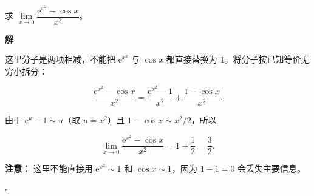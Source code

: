 \documentclass[fontset=fandol]{ctexart}
\newenvironment{solution}{\par\noindent\textbf{解}\quad}{\hfill$\square$\par\vspace{0.8em}}
\newcommand{\ee}{\mathrm{e}}
\begin{document}
\begin{example}[加减结构的拆分]

求 \(\lim\limits_{x \to 0} \dfrac{\ee^{x^2} - \cos x}{x^2}\)。

\end{example}

\begin{solution}

这里分子是两项相减，不能把 \(\ee^{x^2}\) 与 \(\cos x\) 都直接替换为 \(1\)。将分子按已知等价无穷小拆分：

\[

\frac{\ee^{x^2}-\cos x}{x^2}

=\frac{\ee^{x^2}-1}{x^2}+\frac{1-\cos x}{x^2}.

\]

由于 \(\ee^u-1\sim u\)（取 \(u=x^2\)）且 \(1-\cos x\sim x^2/2\)，所以

\[

\lim_{x\to0}\frac{\ee^{x^2}-\cos x}{x^2}

=1+\frac12=\frac32.

\]



\textbf{注意：} 这里不能直接用 \(\ee^{x^2}\sim1\) 和 \(\cos x\sim1\)，因为 \(1-1=0\) 会丢失主要信息。

\end{solution}
\end{document}
